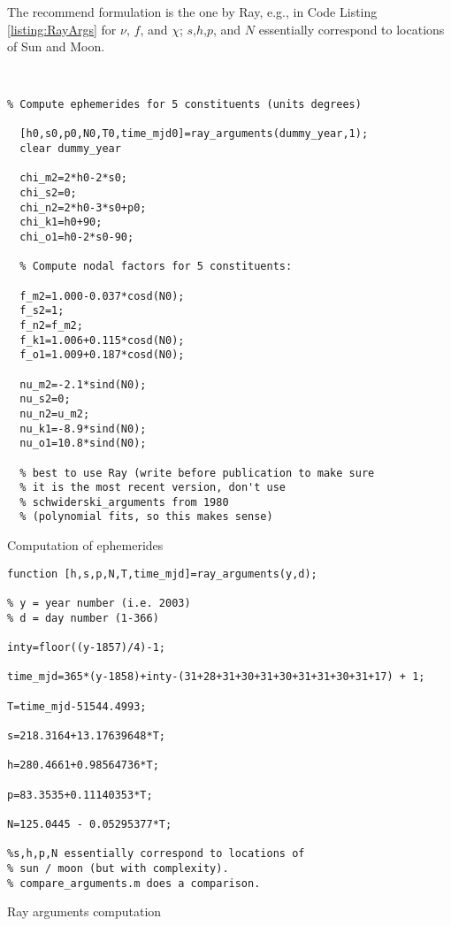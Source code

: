 The recommend formulation is the one by Ray, e.g., in Code Listing \ref{listing:RayArgs} for $\nu$, $f$, and $\chi$; $s$,$h$,$p$, and $N$ essentially correspond to locations of Sun and Moon. 


\begin{listing}[t]
\begin{verbatim}


% Compute ephemerides for 5 constituents (units degrees)

  [h0,s0,p0,N0,T0,time_mjd0]=ray_arguments(dummy_year,1);
  clear dummy_year

  chi_m2=2*h0-2*s0;
  chi_s2=0;
  chi_n2=2*h0-3*s0+p0;
  chi_k1=h0+90;
  chi_o1=h0-2*s0-90;

  % Compute nodal factors for 5 constituents:

  f_m2=1.000-0.037*cosd(N0);
  f_s2=1;
  f_n2=f_m2;
  f_k1=1.006+0.115*cosd(N0);
  f_o1=1.009+0.187*cosd(N0);

  nu_m2=-2.1*sind(N0);
  nu_s2=0;
  nu_n2=u_m2;
  nu_k1=-8.9*sind(N0);
  nu_o1=10.8*sind(N0);
  
  % best to use Ray (write before publication to make sure 
  % it is the most recent version, don't use 
  % schwiderski_arguments from 1980 
  % (polynomial fits, so this makes sense)
\end{verbatim}
\caption{Computation of ephemerides}
\label{listing:ephermides}
\end{listing}

\begin{listing}[b]
\begin{verbatim}
function [h,s,p,N,T,time_mjd]=ray_arguments(y,d);

% y = year number (i.e. 2003)
% d = day number (1-366)

inty=floor((y-1857)/4)-1;

time_mjd=365*(y-1858)+inty-(31+28+31+30+31+30+31+31+30+31+17) + 1;

T=time_mjd-51544.4993;

s=218.3164+13.17639648*T;

h=280.4661+0.98564736*T;

p=83.3535+0.11140353*T;

N=125.0445 - 0.05295377*T;

%s,h,p,N essentially correspond to locations of 
% sun / moon (but with complexity).  
% compare_arguments.m does a comparison.
\end{verbatim}
\caption{Ray arguments computation}
\label{listing:RayArgs}
\end{listing}

